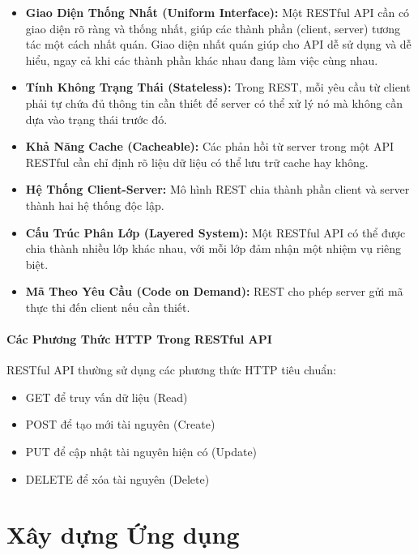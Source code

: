 \documentclass[a4paper]{report}
\begin{document}
\begin{itemize}
    \item \textbf{Giao Diện Thống Nhất (Uniform Interface):} Một RESTful API cần có giao diện rõ ràng và thống nhất, giúp các thành phần (client, server) tương tác một cách nhất quán. Giao diện nhất quán giúp cho API dễ sử dụng và dễ hiểu, ngay cả khi các thành phần khác nhau đang làm việc cùng nhau.
    
    \item \textbf{Tính Không Trạng Thái (Stateless):} Trong REST, mỗi yêu cầu từ client phải tự chứa đủ thông tin cần thiết để server có thể xử lý nó mà không cần dựa vào trạng thái trước đó.
    
    \item \textbf{Khả Năng Cache (Cacheable):} Các phản hồi từ server trong một API RESTful cần chỉ định rõ liệu dữ liệu có thể lưu trữ cache hay không.
    
    \item \textbf{Hệ Thống Client-Server:} Mô hình REST chia thành phần client và server thành hai hệ thống độc lập.
    
    \item \textbf{Cấu Trúc Phân Lớp (Layered System):} Một RESTful API có thể được chia thành nhiều lớp khác nhau, với mỗi lớp đảm nhận một nhiệm vụ riêng biệt.
    
    \item \textbf{Mã Theo Yêu Cầu (Code on Demand):} REST cho phép server gửi mã thực thi đến client nếu cần thiết.
\end{itemize}

\subsubsection{Các Phương Thức HTTP Trong RESTful API}

RESTful API thường sử dụng các phương thức HTTP tiêu chuẩn:

\begin{itemize}
    \item GET để truy vấn dữ liệu (Read)
    \item POST để tạo mới tài nguyên (Create)
    \item PUT để cập nhật tài nguyên hiện có (Update)
    \item DELETE để xóa tài nguyên (Delete)
\end{itemize}

\chapter{Xây dựng Ứng dụng}
\end{document}
